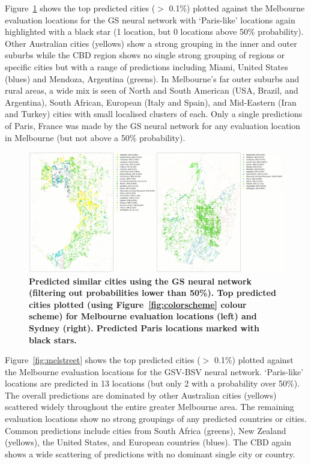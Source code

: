 \documentclass[urbansci,article,submit,moreauthors,pdftex]{Definitions/mdpi}
\begin{document}
Figure~\ref{fig:melsat} shows the top predicted cities ($>$ 0.1\%) plotted against the Melbourne evaluation locations for the GS neural network with `Paris-like' locations again highlighted with a black star (1 location, but 0 locations above 50\% probability). Other Australian cities (yellows) show a strong grouping in the inner and outer suburbs while the CBD region shows no single strong grouping of regions or specific cities but with a range of predictions including Miami, United States (blues) and Mendoza, Argentina (greens). In Melbourne's far outer suburbs and rural areas, a wide mix is seen of North and South American (USA, Brazil, and Argentina), South African, European (Italy and Spain), and Mid-Eastern (Iran and Turkey) cities with small localised clusters of each. Only a single predictions of Paris, France was made by the GS neural network for any evaluation location in Melbourne (but not above a 50\% probability).

\begin{figure}[!htbp]
\centering   
\includegraphics[scale=0.10]{Figure5GS.png}  
\caption{ \bf Predicted similar cities using the GS neural network (filtering out probabilities lower than 50\%). Top predicted cities plotted (using Figure~\ref{fig:colorscheme} colour scheme) for Melbourne evaluation locations (left) and Sydney (right). Predicted Paris locations marked with black stars.}    
 \label{fig:melsat}  
\end{figure} 

Figure~\ref{fig:melstreet} shows the top predicted cities ($>$ 0.1\%) plotted against the Melbourne evaluation locations for the GSV-BSV neural network. `Paris-like' locations are predicted in 13 locations (but only 2 with a probability over 50\%). The overall predictions are dominated by other Australian cities (yellows) scattered widely throughout the entire greater Melbourne area. The remaining evaluation locations show no strong groupings of any predicted countries or cities. Common predictions include cities from South Africa (greens), New Zealand (yellows), the United States, and European countries (blues). The CBD again shows a wide scattering of predictions with no dominant single city or country.
\end{document}
